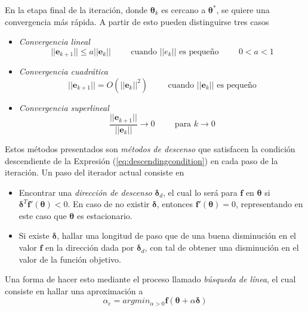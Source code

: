 En la etapa final de la iteración, donde $\bm{\theta}_k$ es cercano a $\bm{\theta}^*$, se quiere una convergencia más rápida. A partir de esto pueden distinguirse tres casos
\begin{itemize}
    \item \textit{Convergencia lineal}
    \begin{equation}
            ||\bm{e}_{k+1}|| \leq a||\bm{e}_k||\hspace{1cm}\text{cuando $||e_k||$ es pequeño}\hspace{1cm}0<a<1
    \end{equation}
    \item \textit{Convergencia cuadrática}
    \begin{equation}
        ||\bm{e}_{k+1}||=O(||\bm{e}_k||^2)\hspace{1cm}\text{cuando $||\bm{e}_k||$ es pequeño}
    \end{equation}
    \item \textit{Convergencia superlineal}
    \begin{equation}
        \frac{||\bm{e}_{k+1}||}{||\bm{e}_k||}\rightarrow 0\hspace{1cm}\text{para $k\rightarrow 0$}
    \end{equation}
\end{itemize}

Estos métodos presentados son \textit{métodos de descenso} que satisfacen la condición descendiente de la Expresión (\ref{eq:descendingcondition}) en cada paso de la iteración. Un paso del iterador actual consiste en
\begin{itemize}
    \item Encontrar una \textit{dirección de descenso} $\bm{\delta}_d$, el cual lo será para $\bm{f}$ en $\bm{\theta}$ si $\bm{\delta}^T\bm{f}'(\bm{\theta}) < 0$. En caso de no existir $\bm{\delta}$, entonces $\bm{f}'(\bm{\theta}) = 0$, representando en este caso que $\bm{\theta}$ es estacionario.
    \item Si existe $\bm{\delta}$, hallar una longitud de paso que de una buena disminución en el valor $\bm{f}$ en la dirección dada por $\bm{\delta}_d$, con tal de obtener una disminución en el valor de la función objetivo.
\end{itemize}

Una forma de hacer esto mediante el proceso llamado \textit{búsqueda de línea}, el cual consiste en hallar una aproximación a
\begin{equation}
    \alpha_e = argmin_{\alpha > 0} \bm{f}(\bm{\theta}+\alpha \bm{\delta})
\end{equation}

